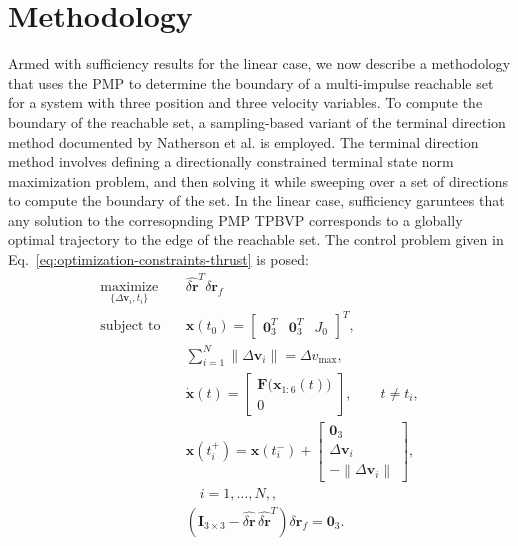 \documentclass[letterpaper, 10 pt, conference]{ieeeconf}  %
\begin{document}
\section{Methodology}
Armed with sufficiency results for the linear case, we now describe a methodology that uses the PMP to determine the boundary of a multi-impulse reachable set for a system with three position and three velocity variables. 
To compute the boundary of the reachable set, a sampling-based variant of the terminal direction method documented by Natherson et al. \cite{natherson2024} is employed. 
The terminal direction method involves defining a directionally constrained terminal state norm maximization problem, and then solving it while sweeping over a set of directions to compute the boundary of the set. 
In the linear case, sufficiency garuntees that any solution to the corresopnding PMP TPBVP corresponds to a globally optimal trajectory to the edge of the reachable set.  
The control problem given in Eq.~\eqref{eq:optimization-constraints-thrust} is posed: 
\begin{align}
\label{eq:optimization-constraints-thrust}
\underset{\{\Delta\mathbf{v}_i,t_i\}}{\text{maximize}}
\quad
& \hat{\delta\mathbf{r}}^T\delta\mathbf{r}_f
\\
\text{subject to}\quad
& \mathbf{x}(t_0)=
  \begin{bmatrix}
    \mathbf{0}_3^T &
    \mathbf{0}_3^T &
    J_0
  \end{bmatrix}^T,
  \nonumber\\
& \sum_{i=1}^{N}
  \left\lVert\Delta\mathbf{v}_i\right\rVert
  =\Delta v_{\max},
  \nonumber\\
& \dot{\mathbf{x}}(t)=
  \begin{bmatrix}
    \mathbf{F}\bigl(\mathbf{x}_{1:6}(t)\bigr)\\
    0
  \end{bmatrix},
  \qquad t\neq t_i,
  \nonumber\\
& \mathbf{x}(t_i^+)=\mathbf{x}(t_i^-)
  +
  \begin{bmatrix}
    \mathbf{0}_3\\
    \Delta\mathbf{v}_i\\
    -\left\lVert\Delta\mathbf{v}_i\right\rVert
  \end{bmatrix},
  \nonumber\\
& \quad i=1,\ldots,N,
,
  \nonumber\\
& \left(
    \mathbf{I}_{3\times3}
    -
    \hat{\delta\boldsymbol{r}}\,
    \hat{\delta\boldsymbol{r}}^T
  \right)
  \delta\boldsymbol{r}_f
  =\mathbf{0}_3.
\end{align}
\end{document}
